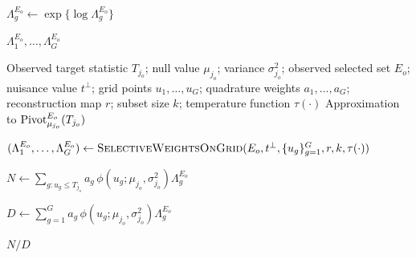 \documentclass[12pt]{article}
\newcommand{\Pivot}{\text{\normalfont Pivot}}
\newcommand{\zg}[1]{{\color{cyan}#1}}
\begin{document}
\begin{appendices}
\begin{algorithm}[H]
\begin{algorithmic}[1]
    \State $\Lambda^{E_o}_g\gets \exp\{\log\Lambda^{E_o}_g\}$
\EndFor

\State \Return $\Lambda^{E_o}_1,\ldots,\Lambda^{E_o}_G$
\end{algorithmic}
\end{algorithm}


\begin{algorithm}[H]
\caption{\textsc{SelectivePivot}: numerical computation of the selective pivot}
\label{alg:selective_pivot_computation}
\begin{algorithmic}[1]
\Require Observed target statistic $T_{j_o}$; null value $\mu_{j_o}$; variance $\sigma_{j_o}^2$; observed selected set $E_o$; nuisance value $t^\perp$; grid points $u_1,\ldots,u_G$; quadrature weights $a_1,\ldots,a_G$; reconstruction map $r$; subset size $k$; temperature function $\tau(\cdot)$
\Ensure Approximation to $\Pivot^{E_o}_{\mu_{j_o}}(T_{j_o})$

\State
$(\Lambda^{E_o}_1,\ldots,\Lambda^{E_o}_G)
\gets
\textsc{SelectiveWeightsOnGrid}
(E_o,t^\perp,\{u_g\}_{g=1}^G,r,k,\tau(\cdot))$

\State
$N
\gets
\displaystyle
\sum_{g:u_g\le T_{j_o}}
a_g\,
\phi(u_g;\mu_{j_o},\sigma_{j_o}^2)
\Lambda^{E_o}_g$

\State
$D
\gets
\displaystyle
\sum_{g=1}^{G}
a_g\,
\phi(u_g;\mu_{j_o},\sigma_{j_o}^2)
\Lambda^{E_o}_g$

\State \Return $N/D$
\end{algorithmic}
\end{algorithm}




\end{appendices}
\end{document}
